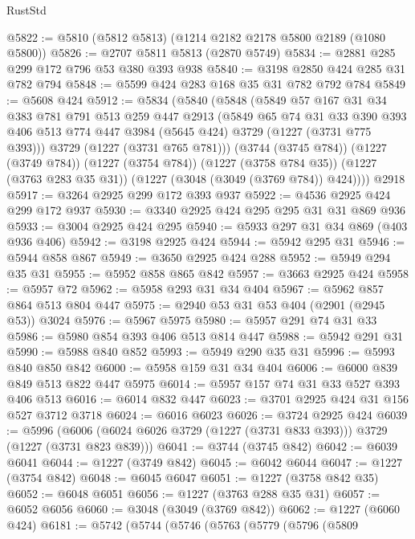 \begin{lexlean}{RustStd}
\begin{coremodule}
@5822 := @5810 (@5812 @5813) (@1214 @2182 @2178 @5800 @2189 (@1080 @5800))
@5826 := @2707 @5811 @5813 (@2870 @5749)
@5834 := @2881 @285 @299 @172 @796 @53 @380 @393 @938
@5840 := @3198 @2850 @424 @285 @31 @782 @794
@5848 := @5599 @424 @283 @168 @35 @31 @782 @792 @784
@5849 := @5608 @424
@5912 := @5834
    (@5840
      (@5848
        (@5849
          @57
          @167
          @31
          @34
          @383
          @781
          @791
          @513
          @259
          @447
          @2913
          (@5849
            @65
            @74
            @31
            @33
            @390
            @393
            @406
            @513
            @774
            @447
            @3984
            (@5645 @424)
            @3729
            (@1227 (@3731 @775 @393)))
          @3729
          (@1227 (@3731 @765 @781)))
        (@3744 (@3745 @784))
        (@1227 (@3749 @784))
        (@1227 (@3754 @784))
        (@1227 (@3758 @784 @35))
        (@1227 (@3763 @283 @35 @31))
        (@1227 (@3048 (@3049 (@3769 @784)) @424))))
    @2918
@5917 := @3264 @2925 @299 @172 @393 @937
@5922 := @4536 @2925 @424 @299 @172 @937
@5930 := @3340 @2925 @424 @295 @295 @31 @31 @869 @936
@5933 := @3004 @2925 @424 @295
@5940 := @5933 @297 @31 @34 @869 (@403 @936 @406)
@5942 := @3198 @2925 @424
@5944 := @5942 @295 @31
@5946 := @5944 @858 @867
@5949 := @3650 @2925 @424 @288
@5952 := @5949 @294 @35 @31
@5955 := @5952 @858 @865 @842
@5957 := @3663 @2925 @424
@5958 := @5957 @72
@5962 := @5958 @293 @31 @34 @404
@5967 := @5962 @857 @864 @513 @804 @447
@5975 := @2940 @53 @31 @53 @404 (@2901 (@2945 @53)) @3024
@5976 := @5967 @5975
@5980 := @5957 @291 @74 @31 @33
@5986 := @5980 @854 @393 @406 @513 @814 @447
@5988 := @5942 @291 @31
@5990 := @5988 @840 @852
@5993 := @5949 @290 @35 @31
@5996 := @5993 @840 @850 @842
@6000 := @5958 @159 @31 @34 @404
@6006 := @6000 @839 @849 @513 @822 @447 @5975
@6014 := @5957 @157 @74 @31 @33 @527 @393 @406 @513
@6016 := @6014 @832 @447
@6023 := @3701 @2925 @424 @31 @156 @527 @3712 @3718
@6024 := @6016 @6023
@6026 := @3724 @2925 @424
@6039 := @5996 (@6006 (@6024 @6026 @3729 (@1227 (@3731 @833 @393))) @3729 (@1227 (@3731 @823 @839)))
@6041 := @3744 (@3745 @842)
@6042 := @6039 @6041
@6044 := @1227 (@3749 @842)
@6045 := @6042 @6044
@6047 := @1227 (@3754 @842)
@6048 := @6045 @6047
@6051 := @1227 (@3758 @842 @35)
@6052 := @6048 @6051
@6056 := @1227 (@3763 @288 @35 @31)
@6057 := @6052 @6056
@6060 := @3048 (@3049 (@3769 @842))
@6062 := @1227 (@6060 @424)
@6181 := @5742
    (@5744
      (@5746
        (@5763
          (@5779
            (@5796
              (@5809

\end{coremodule}
\end{lexlean}
